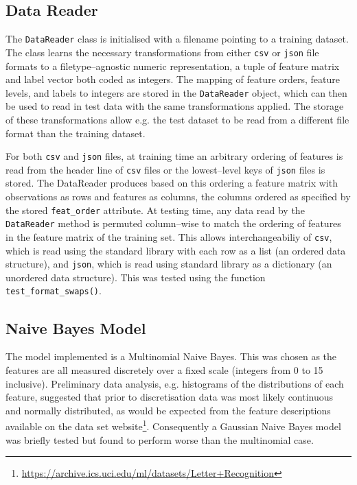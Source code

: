 \documentclass[11pt, twocolumn, a4paper]{article}
\begin{document}
\subsection{Data Reader}
The \texttt{DataReader} class is initialised with a filename pointing to a training dataset. The class learns the necessary transformations from either \texttt{csv} or \texttt{json} file formats to a filetype--agnostic numeric representation, a tuple of feature matrix and label vector both coded as integers. The mapping of feature orders, feature levels, and labels to integers are stored in the \texttt{DataReader} object, which can then be used to read in test data with the same transformations applied. The storage of these transformations allow e.g. the test dataset to be read from a different file format than the training dataset.

For both \texttt{csv} and \texttt{json} files, at training time an arbitrary ordering of features is read from the header line of \texttt{csv} files or the lowest--level keys of \texttt{json} files is stored. The DataReader produces based on this ordering a feature matrix with observations as rows and features as columns, the columns ordered as specified by the stored \texttt{feat\_order} attribute. At testing time, any data read by the \texttt{DataReader} method is permuted column--wise to match the ordering of features in the feature matrix of the training set. This allows interchangeabiliy of \texttt{csv}, which is read using the standard library with each row as a list (an ordered data structure), and \texttt{json}, which is read using standard library as a dictionary (an unordered data structure). This was tested using the function \texttt{test\_format\_swaps()}.

\subsection{Naive Bayes Model}
The model implemented is a Multinomial Naive Bayes. This was chosen as the features are all measured discretely over a fixed scale (integers from 0 to 15 inclusive). Preliminary data analysis, e.g. histograms of the distributions of each feature, suggested that prior to discretisation data was most likely continuous and normally distributed, as would be expected from the feature descriptions available on the data set website\footnote{\url{https://archive.ics.uci.edu/ml/datasets/Letter+Recognition}}. Consequently a Gaussian Naive Bayes model was briefly tested but found to perform worse than the multinomial case.
\end{document}
